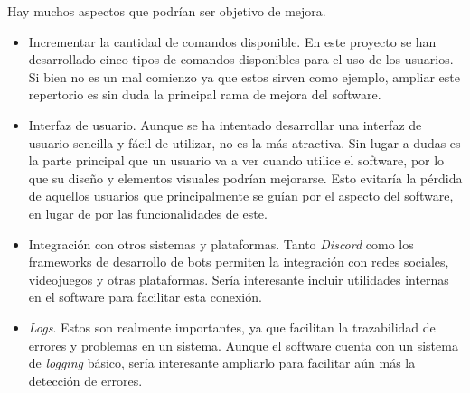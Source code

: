 Hay muchos aspectos que podrían ser objetivo de mejora.

\begin{itemize}
	\item Incrementar la cantidad de comandos disponible. En este proyecto se han desarrollado cinco tipos de comandos disponibles para el uso de los usuarios. Si bien no es un mal comienzo ya que estos sirven como ejemplo, ampliar este repertorio es sin duda la principal rama de mejora del software.
	\item Interfaz de usuario. Aunque se ha intentado desarrollar una interfaz de usuario sencilla y fácil de utilizar, no es la más atractiva. Sin lugar a dudas es la parte principal que un usuario va a ver cuando utilice el software, por lo que su diseño y elementos visuales podrían mejorarse. Esto evitaría la pérdida de aquellos usuarios que principalmente se guían por el aspecto del software, en lugar de por las funcionalidades de este.
	\item Integración con otros sistemas y plataformas. Tanto \textit{Discord} como los frameworks de desarrollo de bots permiten la integración con redes sociales, videojuegos y otras plataformas. Sería interesante incluir utilidades internas en el software para facilitar esta conexión.
	\item \textit{Logs}. Estos son realmente importantes, ya que facilitan la trazabilidad de errores y problemas en un sistema. Aunque el software cuenta con un sistema de \textit{logging} básico, sería interesante ampliarlo para facilitar aún más la detección de errores.
\end{itemize}
